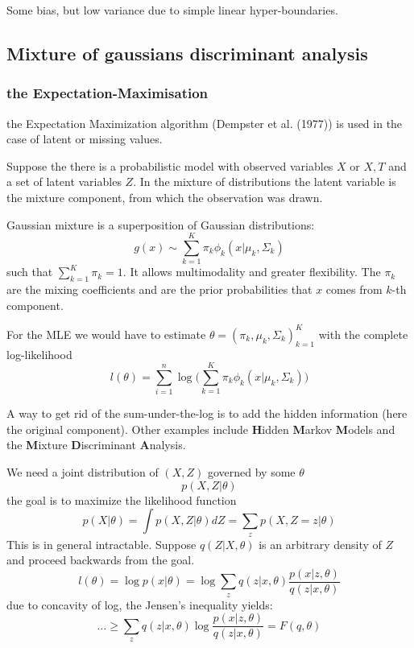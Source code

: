 \documentclass[a4paper]{article}
\begin{document}
Some bias, but low variance due to simple linear hyper-boundaries.




\subsection{Mixture of gaussians discriminant analysis} %
\label{sub:mixture_of_gaussians_discriminant_analysis}

\subsubsection{the Expectation-Maximisation} %
\label{ssub:the_expectation_maximisation}

the Expectation Maximization algorithm (Dempster et al. (1977)) is used in the case of latent or missing values.

Suppose the there is a probabilistic model with observed variables $X$ or $X,T$ and a set of latent variables $Z$.
In the mixture of distributions the latent variable is the mixture component, from which the observation was drawn.

Gaussian mixture is a superposition of Gaussian distributions:
\[g(x) \sim \sum_{k=1}^K \pi_k \phi_k(x\vert \mu_k, \Sigma_k)\]
such that $\sum_{k=1}^K \pi_k = 1$. It allows multimodality and greater flexibility.
The $\pi_k$ are the mixing coefficients and are the prior probabilities that $x$ comes from $k$-th component.

For the MLE we would have to estimate $\theta=(\pi_k,\mu_k,\Sigma_k)_{k=1}^K$ with the complete log-likelihood
\[l(\theta) = \sum_{i=1}^n \log \big(\sum_{k=1}^K\pi_k \phi_k(x\vert \mu_k, \Sigma_k)\big)\]

A way to get rid of the sum-under-the-log is to add the hidden information (here the original component).
Other examples include \textbf{H}idden \textbf{M}arkov \textbf{M}odels and the \textbf{M}ixture \textbf{D}iscriminant \textbf{A}nalysis.

We need a joint distribution of $(X,Z)$ governed by some $\theta$
\[p(X, Z\vert \theta)\]
the goal is to maximize the likelihood function
\[p(X\vert \theta) = \int p(X, Z\vert \theta) dZ = \sum_{z} p(X, Z=z\vert \theta) \]
This is in general intractable.
Suppose $q(Z\vert X,\theta)$ is an arbitrary density of $Z$ and proceed backwards from the goal.
\[l(\theta) = \log p(x\vert \theta) = \log \sum_z q(z\vert x,\theta) \frac{p(x\vert z, \theta)}{q(z\vert x,\theta)} \]
due to concavity of log, the Jensen's inequality yields:
\[\ldots \geq \sum_z q(z\vert x,\theta) \log \frac{p(x\vert z, \theta)}{q(z\vert x,\theta)} = F(q,\theta) \]
\end{document}
